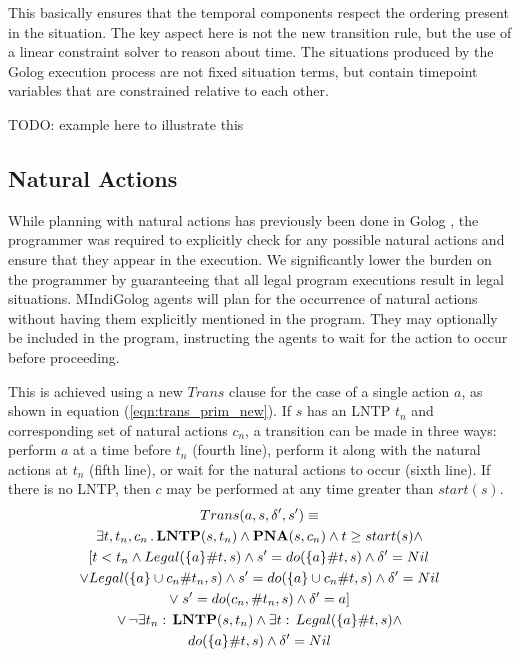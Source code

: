 This basically ensures that the temporal components respect the ordering
present in the situation. The key aspect here is not the new transition
rule, but the use of a linear constraint solver to reason about time.
The situations produced by the Golog execution process are not fixed
situation terms, but contain timepoint variables that are constrained
relative to each other.

TODO: example here to illustrate this


\subsection{Natural Actions}

While planning with natural actions has previously been done in Golog
\citep{pirri00planning_nat_acts}, the programmer was required to
explicitly check for any possible natural actions and ensure that
they appear in the execution. We significantly lower the burden on
the programmer by guaranteeing that all legal program executions result
in legal situations. MIndiGolog agents will plan for the occurrence
of natural actions without having them explicitly mentioned in the
program. They may optionally be included in the program, instructing
the agents to wait for the action to occur before proceeding.

This is achieved using a new $Trans$ clause for the case of a single
action $a$, as shown in equation (\ref{eqn:trans_prim_new}). If
$s$ has an LNTP $t_{n}$ and corresponding set of natural actions
$c_{n}$, a transition can be made in three ways: perform $a$ at
a time before $t_{n}$ (fourth line), perform it along with the natural
actions at $t_{n}$ (fifth line), or wait for the natural actions
to occur (sixth line). If there is no LNTP, then $c$ may be performed
at any time greater than $start(s)$.\begin{multline}
Trans(a,s,\delta',s')\equiv\\
\exists t,t_{n},c_{n}\,.\,\mathbf{LNTP}(s,t_{n})\wedge\mathbf{PNA}(s,c_{n})\wedge t\geq start(s)\wedge\\
\left[t<t_{n}\wedge Legal(\{a\}\#t,s)\wedge s'=do(\{a\}\#t,s)\wedge\delta'=Nil\right.\\
\vee Legal(\{a\}\cup c_{n}\#t_{n},s)\wedge s'=do(\{a\}\cup c_{n}\#t,s)\wedge\delta'=Nil\\
\vee\left.s'=do(c_{n},\#t_{n},s)\wedge\delta'=a\right]\\
\vee\,\neg\exists t_{n}:\,\mathbf{LNTP}(s,t_{n})\wedge\exists t:\, Legal(\{a\}\#t,s)\wedge\\
do(\{a\}\#t,s)\wedge\delta'=Nil\label{eqn:trans_prim_new}\end{multline}


